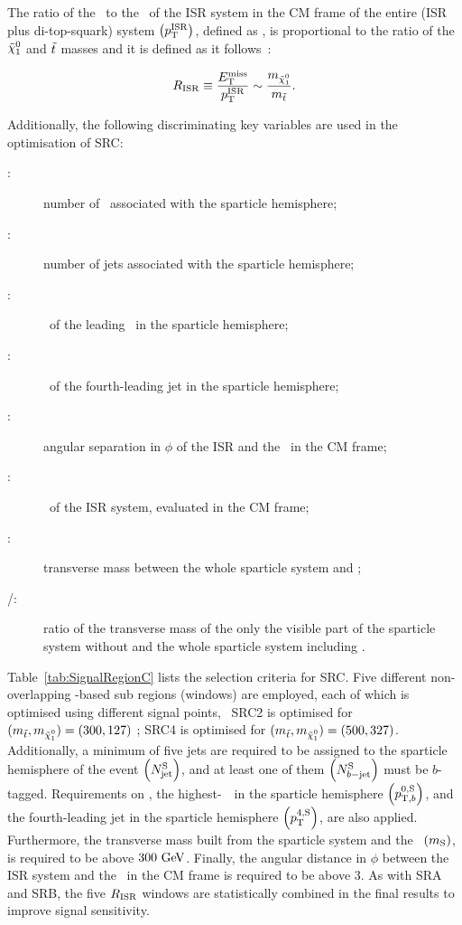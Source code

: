 				The ratio of the \met\ to the \pt\ of the \ac{ISR} system in the \ac{CM} frame of the entire (\ac{ISR} plus di-top-squark) system $\left(p_{\mathrm{T}}^{\mathrm{ISR}}\right)$, defined as \rISR, is proportional to the ratio of the $\ninoone$ and $\tilde{t}$ masses and it is defined as it follows~\cite{An,Macaluso}:
				
				\begin{equation*}
					\rISR \equiv \frac{\met}{\pTISR} \sim \frac{m_{\ninoone}}{m_{\stop}}. 
				\end{equation*}

				\noindent Additionally, the following discriminating key variables are used in the optimisation of SRC: 

				\begin{description}
					\item[\boldmath \nBJetS:] number of \bjs\ associated with the sparticle hemisphere;
					\item[\boldmath \nJetS:] number of jets associated with the sparticle hemisphere;
					\item[\boldmath \pTSBZero:] \pt\ of the leading \bj\ in the sparticle hemisphere;
					\item[\boldmath \pTSFour:] \pt\ of the fourth-leading jet in the sparticle hemisphere;
					\item[\boldmath \dPhiISRMET:] angular separation in $\phi$ of the \ac{ISR} and the \met\ in the \ac{CM} frame;
					\item[\boldmath \pTISR:] \pt\ of the \ac{ISR} system, evaluated in the \ac{CM} frame;
					\item[\boldmath \mS:] transverse mass between the whole sparticle system and \met;
					\item[\boldmath \mV/\mS:] ratio of the transverse mass of the only the visible part of the sparticle system without \met and the whole sparticle system including \met.
				\end{description}				

				Table~\ref{tab:SignalRegionC} lists the selection criteria for SRC. Five different non-overlapping \RISR-based sub regions (windows) are employed, each of which is optimised using different signal points, \eg\ SRC2 is optimised for $(\mstop, \mninoone) = (300,127) $ \GeV; SRC4 is optimised for $(\mstop, \mninoone) = (500,327)$. 
				Additionally, a minimum of five jets are required to be assigned to the sparticle hemisphere of the event $\left(N_{\mathrm{jet}}^{\mathrm{S}}\right)$, and at least one of them $\left(N_{b\mathrm{-jet}}^{\mathrm{S}}\right)$ must be $b$-tagged. Requirements on \pTISR, the highest-\pt\ \bj\ in the sparticle hemisphere $\left(p_{\mathrm{T},b}^{0,\mathrm{S}}\right)$, and the fourth-leading jet in the sparticle hemisphere $\left(p_{\mathrm{T}}^{4,\mathrm{S}}\right)$, are also applied. Furthermore, the transverse mass built from the sparticle system and the \met\ $\left(m_{\mathrm{S}}\right)$, is required to be above $300 \GeV$. Finally, the angular distance in $\phi$ between the \ac{ISR} system and the \ptmiss\ in the \ac{CM} frame is required to be above $3$. As with SRA and SRB, the five $R_{\mathrm{ISR}}$ windows are statistically combined in the final results to improve signal sensitivity.





